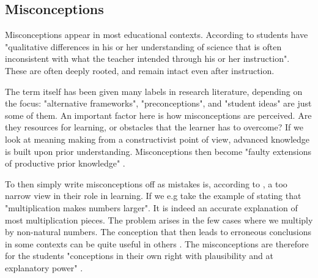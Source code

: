 \subsection{Misconceptions}
Misconceptions appear in most educational contexts. According to \citet{gomez2008elementary} students have "qualitative differences in his or her understanding of science that is often inconsistent with what the teacher intended through his or her instruction". These are often deeply rooted, and remain intact even after instruction. 

The term itself has been given many labels in research literature, depending on the focus: "alternative frameworks", "preconceptions", and "student ideas" are just some of them. An important factor here is how misconceptions are perceived. Are they resources for learning, or obstacles that the learner has to overcome? If we look at meaning making from a constructivist point of view, advanced knowledge is built upon prior understanding. Misconceptions then become "faulty extensions of productive prior knowledge" \citep{smith1994misconceptions}.

To then simply write misconceptions off as mistakes is, according to \citet{smith1994misconceptions}, a too narrow view in their role in learning. If we e.g take the example of stating that "multiplication makes numbers larger". It is indeed an accurate explanation of most multiplication pieces. The problem arises in the few cases where we multiply by non-natural numbers. The conception that then leads to erroneous conclusions in some contexts can be quite useful in others \citep{smith1994misconceptions}. The misconceptions are therefore for the students "conceptions in their own right with plausibility and at explanatory power" \citetext{Smith, diSessa \& Roschelle 1993, referenced in \citealp{larkin2012misconceptions}}. 